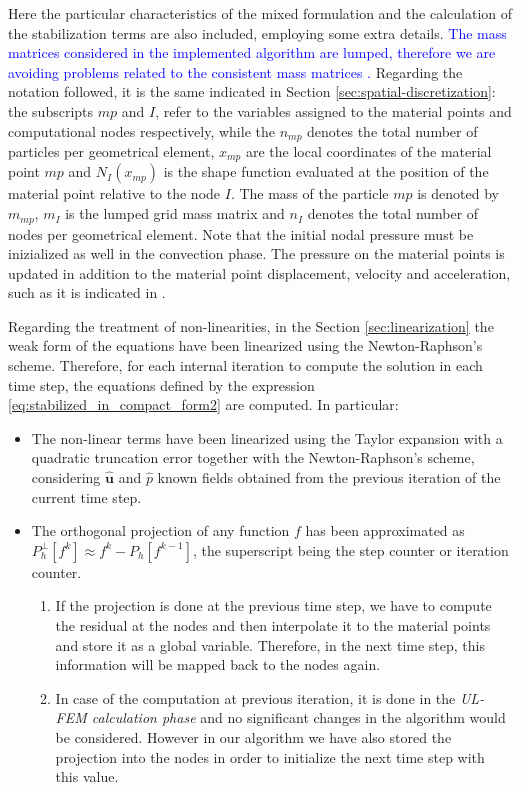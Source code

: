 \documentclass[11pt,english]{article}
\newcommand{\LM}[1]{\textcolor{blue}{#1}}
\def\mp{\textit{mp}}
\begin{document}
Here the particular characteristics of the mixed formulation and the calculation of the stabilization terms are also included, employing some extra details. \LM{The mass matrices considered in the implemented algorithm are lumped, therefore we are avoiding problems related to the consistent mass matrices \cite{love2006unconditionally}.} Regarding the notation followed, it is the same indicated in Section \ref{sec:spatial-discretization}: the subscripts $\mp$ and $I$, refer to the variables assigned to the material points and computational nodes respectively, while the $n_{\mp}$ denotes the total number of particles per geometrical element, $x_{\mp}$ are the local coordinates of the material point $\mp$ and $N_I(x_{\mp})$ is the shape function evaluated at the position of the material point relative to the node $I$. The mass of the particle $\mp$ is denoted by $m_{\mp}$, $m_I$ is the lumped grid mass matrix and $n_I$ denotes the total number of nodes per geometrical element.
   Note that the initial nodal pressure must be inizialized as well in the convection phase. The pressure on the material points is updated in addition to the material point displacement, velocity and acceleration, such as it is indicated in \cite{iaconeta2019stabilized}.

Regarding the treatment of non-linearities, in the Section \ref{sec:linearization} the weak form of the equations have been linearized  using the Newton-Raphson's scheme. Therefore, for each internal iteration to compute the solution in each time step, the equations defined by the expression \eqref{eq:stabilized_in_compact_form2} are computed. In particular:
       \begin{itemize}
           \item The non-linear terms have been linearized using the Taylor expansion with a quadratic truncation error together with the Newton-Raphson's scheme, considering $\hat{\boldsymbol{u}}$ and $\hat{p}$ known fields obtained from the previous iteration of the current time step.
           \item The orthogonal projection of any function $f$ has been approximated as $P_h^{\perp}[f^k]\approx f^k - P_h[f^{k-1}]$, the superscript being the step counter or iteration counter.
           \begin{enumerate}

           	\item If the projection is done at the previous time step, we have to compute the residual at the nodes and then interpolate it to the material points and store it as a global variable. Therefore, in the next time step, this information will be mapped back to the nodes again.
           \item In case of the computation at previous iteration, it is done in the \textit{UL-FEM calculation phase} and no significant changes  in the algorithm would be considered. However in our algorithm we have also stored the projection into the nodes in order to initialize the next time step with this value.
           \end{enumerate}
       \end{itemize}
  
\end{document}
